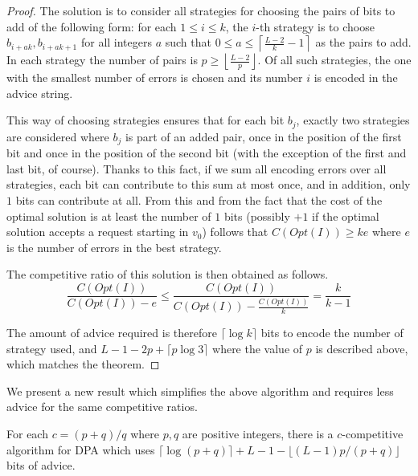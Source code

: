 \begin{proof}
    The solution is to consider all strategies for choosing the pairs of
    bits to add of the following form: for each $1 \leq i \leq k$, the
    $i$-th strategy is to choose $b_{i+ak}, b_{i+ak+1}$ for all integers
    $a$ such that $0 \leq a \leq \left\lceil\frac{L-2}{k}-1\right\rceil$
    as the pairs to add. In each strategy the number of pairs is $p \geq
    \left\lfloor\frac{L-2}{p}\right\rfloor$. Of all such strategies, the
    one with the smallest number of errors is chosen and its number $i$ is
    encoded in the advice string.

    This way of choosing strategies ensures that for each bit $b_j$,
    exactly two strategies are considered where $b_j$ is part of an added
    pair, once in the position of the first bit and once in the position
    of the second bit (with the exception of the first and last bit, of
    course). Thanks to this fact, if we sum all encoding errors over all
    strategies, each bit can contribute to this sum at most once, and in
    addition, only $1$ bits can contribute at all. From this and from the
    fact that the cost of the optimal solution is at least the number of
    $1$ bits (possibly $+1$ if the optimal solution accepts a request
    starting in $v_0$) follows that $C(Opt(I)) \geq ke$ where $e$ is the
    number of errors in the best strategy.

    The competitive ratio of this solution is then obtained as follows.
    $$
        \frac{C(Opt(I))}{C(Opt(I)) - e} \leq \frac{C(Opt(I))}{C(Opt(I)) -
        \frac{C(Opt(I))}{k}} = \frac{k}{k-1}
    $$

    The amount of advice required is therefore $\lceil\log{}k\rceil$ bits
    to encode the number of strategy used, and $L - 1 - 2p +
    \lceil{}p\log{}3\rceil$ where the value of $p$ is described above,
    which matches the theorem.
\end{proof}

We present a new result which simplifies the above algorithm and requires
less advice for the same competitive ratios.

\begin{theorem}\label{theorem:dpa-fraction}
    For each $c = (p+q)/q$ where $p, q$ are positive integers, there is a
    $c$-competitive algorithm for DPA which uses $\lceil\log(p+q)\rceil +
    L - 1 - \lfloor (L-1) p / (p + q)\rfloor$ bits of advice.
\end{theorem}

